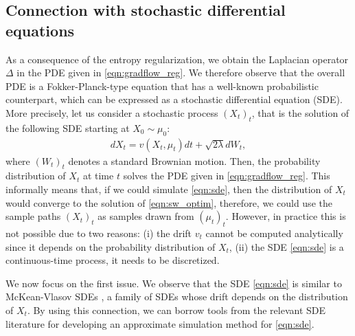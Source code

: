 \subsection{Connection with stochastic differential equations}

%
% 
As a consequence of the entropy regularization, we obtain the Laplacian operator $\Delta$ in the PDE given in \eqref{eqn:gradflow_reg}. We therefore observe that the overall PDE is a Fokker-Planck-type equation \cite{bogachev2015fokker} that has a well-known probabilistic counterpart, which can be expressed as a stochastic differential equation (SDE). More precisely, let us consider a stochastic process $(X_t)_{t}$, that is the solution of the following SDE starting at $X_0 \sim \mu_0$:
\begin{align}
d X_t = v(X_t,\mu_t) dt + \sqrt{2 \lambda } d W_t, \label{eqn:sde}
\end{align}
where $(W_t)_t$ denotes a standard Brownian motion. Then, the probability distribution of $X_t$ at time $t$ solves the PDE given in \eqref{eqn:gradflow_reg}. This informally means that, if we could simulate \eqref{eqn:sde}, then the distribution of $X_t$ would converge to the solution of \eqref{eqn:sw_optim}, therefore, we could use the sample paths $(X_t)_t$ as samples drawn from $(\mu_t)_t$. However, in practice this is not possible due to two reasons: (i) the drift $v_t$ cannot be computed analytically since it depends on the probability distribution of $X_t$, (ii) the SDE \eqref{eqn:sde} is a continuous-time process, it needs to be discretized.








We now focus on the first issue.
% 
We observe that the SDE \eqref{eqn:sde} is similar to McKean-Vlasov SDEs \cite{veretennikov2006ergodic,mishura2016existence}, a family of SDEs whose drift depends on the distribution of $X_t$. By using this connection, we can borrow tools from the relevant SDE literature \cite{malrieu03,cgm-08} for developing an approximate simulation method for \eqref{eqn:sde}.

